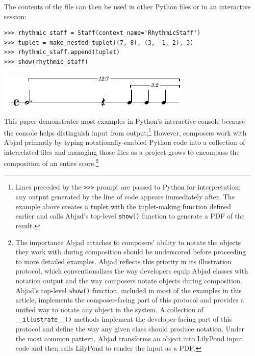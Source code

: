 \documentclass{article}
\begin{document}
\noindent The contents of the file can then be used in other Python files or in
an interactive session:

\begin{lstlisting}
>>> rhythmic_staff = Staff(context_name='RhythmicStaff')
>>> tuplet = make_nested_tuplet((7, 8), (3, -1, 2), 3)
>>> rhythmic_staff.append(tuplet)
>>> show(rhythmic_staff)
\end{lstlisting}
\includegraphics{assets/lilypond-a8fcfb8f401a81a10afeb01a4f9f03ab.pdf}

\noindent This paper demonstrates most examples in Python's interactive console
because the console helps distinguish input from output;\footnote{Lines
preceded by the \texttt{>>>} prompt are passed to Python for interpretation;
any output generated by the line of code appears immediately after. The example
above creates a tuplet with the tuplet-making function defined earlier and
calls Abjad's top-level \texttt{show()} function to generate a PDF of the
result.} However, composers work with Abjad primarily by typing
notationally-enabled Python code into a collection of interrelated files and
managing those files as a project grows to encompass the composition of an
entire score.\footnote{The importance Abjad attaches to composers' ability to
notate the objects they work with during composition should be underscored
before proceeding to more detailed examples. Abjad reflects this priority in
its illustration protocol, which conventionalizes the way developers equip
Abjad classes with notation output and the way composers notate objects during
composition. Abjad's top-level \texttt{show()} function, included in most of
the examples in this article, implements the composer-facing part of this
protocol and provides a unified way to notate any object in the system. A
collection of \texttt{\_\_illustrate\_\_()} methods implement the
developer-facing part of this protocol and define the way any given class
should produce notation. Under the most common pattern, Abjad transforms an
object into LilyPond input code and then calls LilyPond to render the input as
a PDF.}
\end{document}
